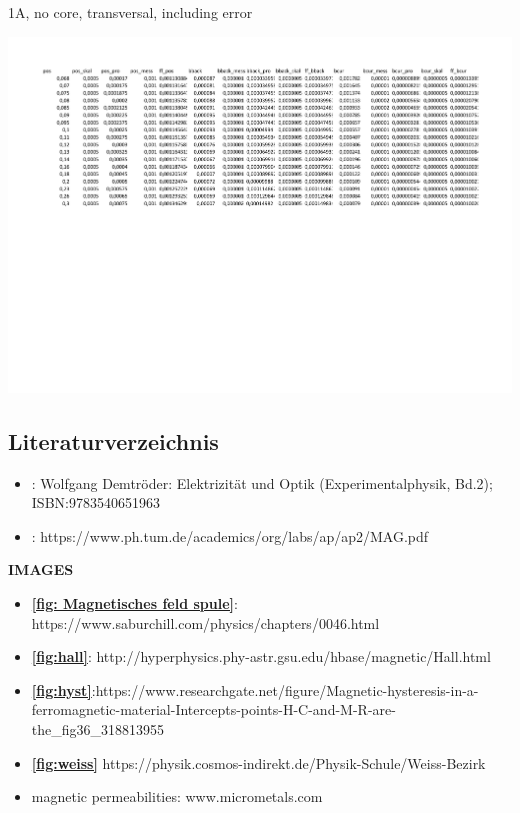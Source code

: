 \documentclass[12pt]{article}
\begin{document}
	\begin{table}[H]
		\caption{1A, no core, transversal, including error}
		\includegraphics[width=18cm]{Daten.xlsx - 1A ohne Kern transverse.pdf}	
	\end{table}
	
	
	\subsection{Literaturverzeichnis}\label{sec:lit}
	\begin{itemize}
		\item: Wolfgang Demtröder: Elektrizität und Optik (Experimentalphysik, Bd.2); ISBN:9783540651963
		\item: https://www.ph.tum.de/academics/org/labs/ap/ap2/MAG.pdf
	\end{itemize}
	{\bf IMAGES}
	\begin{itemize}
		\item {\bf \ref{fig: Magnetisches feld spule}}: https://www.saburchill.com/physics/chapters/0046.html
		\item {\bf 	\ref{fig:hall}}: http://hyperphysics.phy-astr.gsu.edu/hbase/magnetic/Hall.html
		\item {\bf \ref{fig:hyst}}:https://www.researchgate.net/figure/Magnetic-hysteresis-in-a-ferromagnetic-material-Intercepts-points-H-C-and-M-R-are-the\_fig36\_318813955 
		\item {\bf \ref{fig:weiss}} https://physik.cosmos-indirekt.de/Physik-Schule/Weiss-Bezirk
		\item magnetic permeabilities: www.micrometals.com
		
	\end{itemize}
\end{document}
